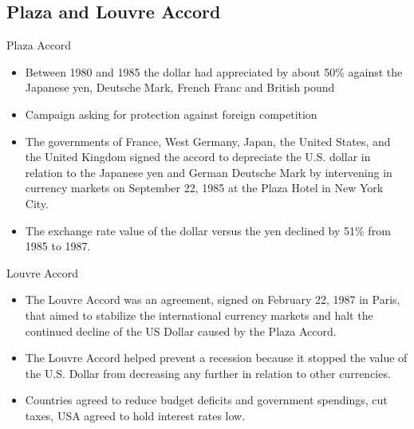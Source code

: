 \documentclass[international_finance_p1.tex]{subfiles}
\begin{document}
\subsection{Plaza and Louvre Accord}
\begin{frame}{Plaza Accord}
\begin{itemize}[<+->]
\item
Between 1980 and 1985 the dollar had appreciated by about 50\% against the Japanese yen, Deutsche Mark, French Franc and British pound
\item
Campaign asking for protection against foreign competition
\item
The governments of France, West Germany, Japan, the United States, and the United Kingdom signed the accord to depreciate the U.S. dollar in relation to the Japanese yen and German Deutsche Mark by intervening in currency markets on September 22, 1985 at the Plaza Hotel in New York City.
\item
The exchange rate value of the dollar versus the yen declined by 51\% from 1985 to 1987.
\end{itemize}
\end{frame}
\begin{frame}{Louvre Accord}
\begin{itemize}[<+->]
\item
The Louvre Accord was an agreement, signed on February 22, 1987 in Paris, that aimed to stabilize the international currency markets and halt the continued decline of the US Dollar caused by the Plaza Accord.
\item
The Louvre Accord helped prevent a recession because it stopped the value of the U.S. Dollar from decreasing any further in relation to other currencies.
\item
Countries agreed to reduce budget deficits and government spendings, cut taxes, USA agreed to hold interest rates low.
\end{itemize}
\end{frame}
\end{document}
